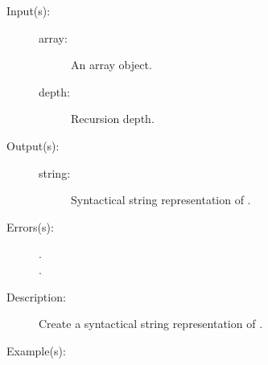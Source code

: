 \begin{description}
\label{sprintsdict:arraytype}
\item[{\onyxop{array depth}{arraytype}{string}}: ]
	\begin{description}\item[]
	\item[Input(s): ]
		\begin{description}\item[]
		\item[array: ]
			An array object.
		\item[depth: ]
			Recursion depth.
		\end{description}
	\item[Output(s): ]
		\begin{description}\item[]
		\item[string: ]
			Syntactical string representation of .
		\end{description}
	\item[Errors(s): ]
		\begin{description}\item[]
		\item[.]
		\item[.]
		\end{description}
	\item[Description: ]
		Create a syntactical string representation of .
	\item[Example(s): ]\begin{verbatim}


\end{verbatim}
\end{description}
\end{description}
